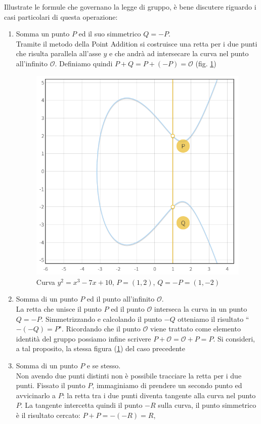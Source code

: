 \documentclass[a4paper,12pt]{tesiinfo}
\begin{document}
Illustrate le formule che governano la legge di gruppo, \`e bene discutere riguardo i casi particolari di questa operazione:
\begin{enumerate}
 \item Somma un punto $P$ ed il suo simmetrico $Q = -P$. 
 \\
 Tramite il metodo della Point Addition si costruisce una retta per i due punti che risulta parallela all'asse $y$ e che andr\`a ad intersecare la curva nel punto all'infinito $\mathcal{O}$. Definiamo quindi $P + Q = P+(-P) = \mathcal{O}$ (fig. \ref{PA_P+(-P)})
 \begin{figure}[H]
  \includegraphics[width=.6\textwidth,center]{PA_P+(-P)}
  \caption{Curva $y^2 = x^3-7x+10$, $P=(1, 2)$, $Q=-P=(1, -2)$}
  \label{PA_P+(-P)}
 \end{figure}
 \label{CPsimmetrici}
 \item Somma di un punto $P$ ed il punto all'infinito $\mathcal{O}$. 
 \\ 
 La retta che unisce il punto $P$ ed il punto $\mathcal{O}$ interseca la curva in un punto 
 \\$Q = -P$. Simmetrizzando e calcolando il punto $-Q$ otteniamo il risultato ``$-(-Q) = P$".
 Ricordando che il punto $\mathcal{O}$ viene trattato come elemento identit\`a del gruppo possiamo infine scrivere $P+\mathcal{O} = \mathcal{O}+P = P$. Si consideri, a tal proposito, la stessa figura (\ref{PA_P+(-P)}) del caso precedente
 \item Somma di un punto $P$ e se stesso. 
 \\
 Non avendo due punti distinti non \`e possibile tracciare la retta per i due punti. Fissato il punto $P$, immaginiamo di prendere un secondo punto ed avvicinarlo a $P$: la retta tra i due punti diventa tangente alla curva nel punto $P$. La tangente intercetta quindi il punto $-R$ sulla curva, il punto simmetrico \`e il risultato cercato: $P + P = -(-R) = R$,

\end{enumerate}
\end{document}
